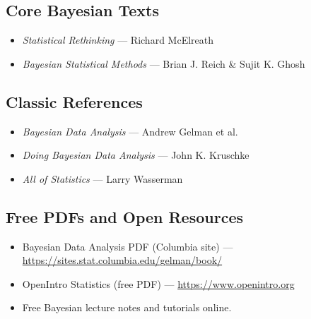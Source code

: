 \documentclass[12pt]{article}
\begin{document}
\subsection{Core Bayesian Texts}
\begin{itemize}
    \item \textit{Statistical Rethinking} --- Richard McElreath
    \item \textit{Bayesian Statistical Methods} --- Brian J. Reich \& Sujit K. Ghosh
\end{itemize}

\subsection{Classic References}
\begin{itemize}
    \item \textit{Bayesian Data Analysis} --- Andrew Gelman et al.
    \item \textit{Doing Bayesian Data Analysis} --- John K. Kruschke
    \item \textit{All of Statistics} --- Larry Wasserman
\end{itemize}

\subsection{Free PDFs and Open Resources}
\begin{itemize}
    \item Bayesian Data Analysis PDF (Columbia site) --- \url{https://sites.stat.columbia.edu/gelman/book/}
    \item OpenIntro Statistics (free PDF) --- \url{https://www.openintro.org}
    \item Free Bayesian lecture notes and tutorials online.
\end{itemize}
\end{document}
